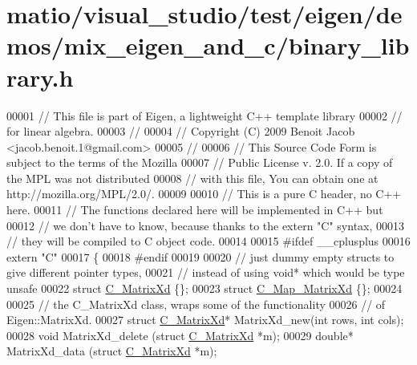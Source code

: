 \hypertarget{matio_2visual__studio_2test_2eigen_2demos_2mix__eigen__and__c_2binary__library_8h_source}{}\section{matio/visual\+\_\+studio/test/eigen/demos/mix\+\_\+eigen\+\_\+and\+\_\+c/binary\+\_\+library.h}
\label{matio_2visual__studio_2test_2eigen_2demos_2mix__eigen__and__c_2binary__library_8h_source}

\begin{DoxyCode}
00001 \textcolor{comment}{// This file is part of Eigen, a lightweight C++ template library}
00002 \textcolor{comment}{// for linear algebra.}
00003 \textcolor{comment}{//}
00004 \textcolor{comment}{// Copyright (C) 2009 Benoit Jacob <jacob.benoit.1@gmail.com>}
00005 \textcolor{comment}{//}
00006 \textcolor{comment}{// This Source Code Form is subject to the terms of the Mozilla}
00007 \textcolor{comment}{// Public License v. 2.0. If a copy of the MPL was not distributed}
00008 \textcolor{comment}{// with this file, You can obtain one at http://mozilla.org/MPL/2.0/.}
00009 
00010 \textcolor{comment}{// This is a pure C header, no C++ here.}
00011 \textcolor{comment}{// The functions declared here will be implemented in C++ but}
00012 \textcolor{comment}{// we don't have to know, because thanks to the extern "C" syntax,}
00013 \textcolor{comment}{// they will be compiled to C object code.}
00014 
00015 \textcolor{preprocessor}{#ifdef \_\_cplusplus}
00016 \textcolor{keyword}{extern} \textcolor{stringliteral}{"C"}
00017 \{
00018 \textcolor{preprocessor}{#endif}
00019 
00020   \textcolor{comment}{// just dummy empty structs to give different pointer types,}
00021   \textcolor{comment}{// instead of using void* which would be type unsafe}
00022   \textcolor{keyword}{struct }\hyperlink{struct_c___matrix_xd}{C\_MatrixXd} \{\};
00023   \textcolor{keyword}{struct }\hyperlink{struct_c___map___matrix_xd}{C\_Map\_MatrixXd} \{\};
00024 
00025   \textcolor{comment}{// the C\_MatrixXd class, wraps some of the functionality}
00026   \textcolor{comment}{// of Eigen::MatrixXd.}
00027   \textcolor{keyword}{struct }\hyperlink{struct_c___matrix_xd}{C\_MatrixXd}* MatrixXd\_new(\textcolor{keywordtype}{int} rows, \textcolor{keywordtype}{int} cols);
00028   \textcolor{keywordtype}{void}    MatrixXd\_delete     (\textcolor{keyword}{struct} \hyperlink{struct_c___matrix_xd}{C\_MatrixXd} *m);
00029   \textcolor{keywordtype}{double}* MatrixXd\_data       (\textcolor{keyword}{struct} \hyperlink{struct_c___matrix_xd}{C\_MatrixXd} *m);

\end{DoxyCode}
